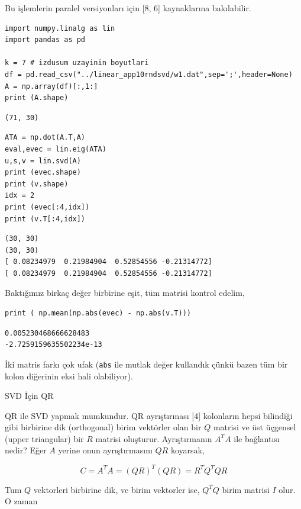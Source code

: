 \documentclass[12pt,fleqn]{article}\usepackage{../../common}
\begin{document}
Bu işlemlerin paralel versiyonları için [8, 6] kaynaklarına bakılabilir.

\begin{verbatim}
import numpy.linalg as lin
import pandas as pd

k = 7 # izdusum uzayinin boyutlari
df = pd.read_csv("../linear_app10rndsvd/w1.dat",sep=';',header=None)
A = np.array(df)[:,1:]
print (A.shape)
\end{verbatim}

\begin{verbatim}
(71, 30)
\end{verbatim}

\begin{verbatim}
ATA = np.dot(A.T,A)
eval,evec = lin.eig(ATA)
u,s,v = lin.svd(A)
print (evec.shape)
print (v.shape)
idx = 2
print (evec[:4,idx])
print (v.T[:4,idx])
\end{verbatim}

\begin{verbatim}
(30, 30)
(30, 30)
[ 0.08234979  0.21984904  0.52854556 -0.21314772]
[ 0.08234979  0.21984904  0.52854556 -0.21314772]
\end{verbatim}

Baktığımız birkaç değer birbirine eşit, tüm matrisi kontrol edelim,

\begin{verbatim}
print ( np.mean(np.abs(evec) - np.abs(v.T)))
\end{verbatim}

\begin{verbatim}
0.005230468666628483
-2.7259159635502234e-13
\end{verbatim}

İki matris farkı çok ufak (\verb!abs! ile mutlak değer kullandık çünkü bazen
tüm bir kolon diğerinin eksi hali olabiliyor).

SVD İçin QR

QR ile SVD yapmak mumkundur. QR ayrıştırması [4] kolonların hepsi bilindiği gibi
birbirine dik (orthogonal) birim vektörler olan bir $Q$ matrisi ve üst üçgensel
(upper triangular) bir $R$ matrisi oluşturur. Ayrıştırmanın $A^TA$ ile
bağlantısı nedir? Eğer $A$ yerine onun ayrıştırmasını $QR$ koyarsak,

$$
C = A^TA = (QR)^T (QR) = R^T Q^T QR
$$

Tum $Q$ vektorleri birbirine dik, ve birim vektorler ise, $Q^T Q$
birim matrisi $I$ olur. O zaman
\end{document}
